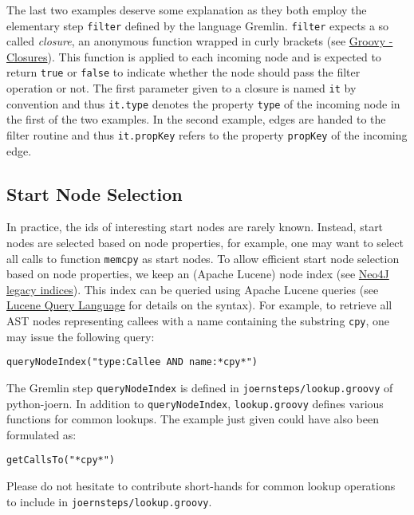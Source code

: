 \documentclass[a4paper]{article}
\newcommand{\code}[1]{\texttt{\small #1}}
\begin{document}
The last two examples deserve some explanation as they both employ the
elementary step \code{filter} defined by the language
Gremlin. \code{filter} expects a so called \emph{closure}, an
anonymous function wrapped in curly brackets (see
\href{http://groovy.codehaus.org/Closures}{Groovy - Closures}). This
function is applied to each incoming node and is expected to return
\code{true} or \code{false} to indicate whether the node should pass
the filter operation or not. The first parameter given to a closure is
named \code{it} by convention and thus \code{it.type} denotes the
property \code{type} of the incoming node in the first of the two
examples.  In the second example, edges are handed to the filter
routine and thus \code{it.propKey} refers to the property
\code{propKey} of the incoming edge.

\subsection{Start Node Selection}
\label{sec:startNode}

In practice, the ids of interesting start nodes are rarely
known. Instead, start nodes are selected based on node properties, for
example, one may want to select all calls to function \code{memcpy} as
start nodes. To allow efficient start node selection based on node
properties, we keep an (Apache Lucene) node index (see
\href{http://docs.neo4j.org/chunked/stable/indexing.html}{Neo4J legacy
indices}). This index can be queried using Apache Lucene queries (see
\href{http://lucene.apache.org/core/2_9_4/queryparsersyntax.html}{Lucene
  Query Language} for details on the syntax). For example, to retrieve
all AST nodes representing callees with a name containing the
substring \code{cpy}, one may issue the following query:
\begin{verbatim}
queryNodeIndex("type:Callee AND name:*cpy*")
\end{verbatim}

The Gremlin step \code{queryNodeIndex} is defined in
\code{joernsteps/lookup.groovy} of python-joern. In addition to
\code{queryNodeIndex}, \code{lookup.groovy} defines various functions
for common lookups. The example just given could have also been
formulated as:
\begin{verbatim}
getCallsTo("*cpy*")
\end{verbatim}

Please do not hesitate to contribute short-hands for common lookup
operations to include in \code{joernsteps/lookup.groovy}.
\end{document}
